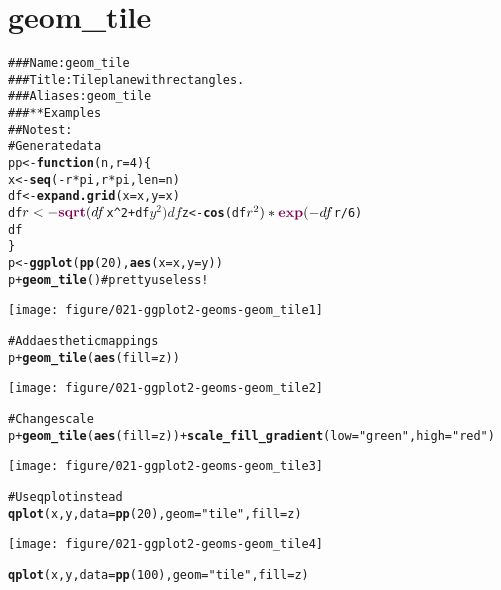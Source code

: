 \documentclass[a4paper,titlepage]{tufte-handout}\usepackage{graphicx, color}
\makeatletter
\def\maxwidth{ %
  \ifdim\Gin@nat@width>\linewidth
    \linewidth
  \else
    \Gin@nat@width
  \fi
}
\newcommand{\hlfunctioncall}[1]{\textcolor[rgb]{0.501960784313725,0,0.329411764705882}{\textbf{#1}}}%
\newcommand{\hlstring}[1]{\textcolor[rgb]{0.6,0.6,1}{#1}}%
\newcommand{\hlcomment}[1]{\textcolor[rgb]{0.180392156862745,0.6,0.341176470588235}{#1}}%
\newenvironment{kframe}{%
 \def\at@end@of@kframe{}%
 \ifinner\ifhmode%
  \def\at@end@of@kframe{\end{minipage}}%
  \begin{minipage}{\columnwidth}%
 \fi\fi%
 \def\FrameCommand##1{\hskip\@totalleftmargin \hskip-\fboxsep
 \colorbox{shadecolor}{##1}\hskip-\fboxsep
     \hskip-\linewidth \hskip-\@totalleftmargin \hskip\columnwidth}%
 \MakeFramed {\advance\hsize-\width
   \@totalleftmargin\z@ \linewidth\hsize
   \@setminipage}}%
 {\par\unskip\endMakeFramed%
 \at@end@of@kframe}
\newenvironment{knitrout}{}{} %
\makeatother
\begin{document}
\section{geom\_tile}

\begin{knitrout}
\color{fgcolor}\begin{kframe}
\begin{alltt}
\hlcomment{### Name: geom_tile}
\hlcomment{### Title: Tile plane with rectangles.}
\hlcomment{### Aliases: geom_tile}
\hlcomment{### ** Examples}
\hlcomment{## No test: }
\hlcomment{# Generate data}
pp <- \hlfunctioncall{function} (n,r=4) \{
 x <- \hlfunctioncall{seq}(-r*pi, r*pi, len=n)
 df <- \hlfunctioncall{expand.grid}(x=x, y=x)
 df$r <- \hlfunctioncall{sqrt}(df$x^2 + df$y^2)
 df$z <- \hlfunctioncall{cos}(df$r^2)*\hlfunctioncall{exp}(-df$r/6)
 df
\}
p <- \hlfunctioncall{ggplot}(\hlfunctioncall{pp}(20), \hlfunctioncall{aes}(x=x,y=y))
p + \hlfunctioncall{geom_tile}() \hlcomment{#pretty useless!}
\end{alltt}
\end{kframe}\texttt{[image: figure/021-ggplot2-geoms-geom\_tile1]} \begin{kframe}\begin{alltt}
\hlcomment{# Add aesthetic mappings}
p + \hlfunctioncall{geom_tile}(\hlfunctioncall{aes}(fill=z))
\end{alltt}
\end{kframe}\texttt{[image: figure/021-ggplot2-geoms-geom\_tile2]} \begin{kframe}\begin{alltt}
\hlcomment{# Change scale}
p + \hlfunctioncall{geom_tile}(\hlfunctioncall{aes}(fill=z)) + \hlfunctioncall{scale_fill_gradient}(low=\hlstring{"green"}, high=\hlstring{"red"})
\end{alltt}
\end{kframe}\texttt{[image: figure/021-ggplot2-geoms-geom\_tile3]} \begin{kframe}\begin{alltt}
\hlcomment{# Use qplot instead}
\hlfunctioncall{qplot}(x, y, data=\hlfunctioncall{pp}(20), geom=\hlstring{"tile"}, fill=z)
\end{alltt}
\end{kframe}\texttt{[image: figure/021-ggplot2-geoms-geom\_tile4]} \begin{kframe}\begin{alltt}
\hlfunctioncall{qplot}(x, y, data=\hlfunctioncall{pp}(100), geom=\hlstring{"tile"}, fill=z)

\end{alltt}
\end{kframe}
\end{knitrout}
\end{document}
